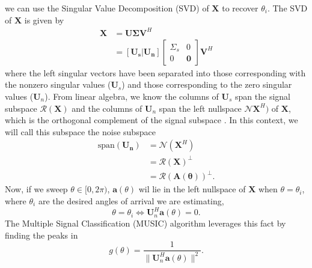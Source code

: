 we can use the Singular Value Decomposition (SVD) of $\bm{X}$ to recover
$\theta_i$. The SVD of $\bm{X}$ is given by
\begin{align}
	\bm{X} &= \bm{U} \bm{\Sigma} \bm{V}^H\\
	&= [\bm{U_s} | \bm{U_n}] \begin{bmatrix} \Sigma_s & 0 \\
	0 & \bm{0} \end{bmatrix} \bm{V}^H
\end{align}
where the left singular vectors have been separated into those corresponding
with the nonzero singular values ($\bm{U}_s$) and those corresponding to the
zero singular values ($\bm{U}_n$). From linear algebra, we know the columns of
$\bm{U}_s$ span the signal subspace $\mathcal{R}(\bm{X})$ and the columns of
$\bm{U}_n$ span the left nullspace $\mathcal{N}{\bm{X}^H})$ of $\bm{X}$, which
is the orthogonal complement of the signal subspace \cite{meyer2000matrix}. In this context, we will
call this subspace the noise subspace
\begin{align}
	\text{span}(\bm{U_n}) &= \mathcal{N}(\bm{X}^H) \\
	&= \mathcal{R}(\bm{X})^\perp\\
	&= \mathcal{R}(\bm{A}(\bm{\theta}))^\perp.
\end{align}
Now, if we sweep $\theta \in [0, 2\pi)$, $\bm{a}(\theta)$ wil lie in the left
nullspace of $\bm{X}$ when $\theta=\theta_i$, where $\theta_i$ are the desired
angles of arrival we are estimating, 
\begin{equation}
	\theta = \theta_i \iff \bm{U}_n^H \bm{a}(\theta) = 0.
\end{equation}
The Multiple Signal Classification (MUSIC)
algorithm leverages this fact by finding the peaks in \cite{schmidt1986multiple}
\begin{equation}
	g(\theta) = \frac{1}{\|\bm{U}_n^H \bm{a}(\theta)\|^2}.
\end{equation}

